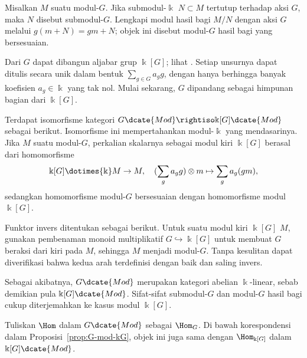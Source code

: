 \begin{definisi}
	Misalkan $M$ suatu modul-$G$. Jika submodul-$\Bbbk$ $N\subset M$ tertutup
	terhadap aksi $G$, maka $N$ disebut submodul-$G$. Lengkapi modul hasil bagi
	$M/N$ dengan aksi $G$ melalui $g(m+N)=gm+N$; objek ini disebut modul-$G$
	hasil bagi yang bersesuaian.
\end{definisi}

Dari $G$ dapat dibangun aljabar grup $\Bbbk[G]$; lihat
\cite[Definisi 5.6.3]{Li1}. Setiap unsurnya dapat ditulis secara unik dalam
bentuk $\sum_{g\in G}a_gg$, dengan hanya berhingga banyak koefisien
$a_g\in\Bbbk$ yang tak nol. Mulai sekarang, $G$ dipandang sebagai himpunan
bagian dari $\Bbbk[G]$.

\begin{proposisi}\label{prop:G-mod-kG}
	Terdapat isomorfisme kategori
	$G\dcate{Mod}\rightiso\Bbbk[G]\dcate{Mod}$ sebagai berikut. Isomorfisme ini
	mempertahankan modul-$\Bbbk$ yang mendasarinya. Jika $M$ suatu modul-$G$,
	perkalian skalarnya sebagai modul kiri $\Bbbk[G]$ berasal dari homomorfisme
	\[ \Bbbk[G] \dotimes{\Bbbk} M \to M, \quad (\sum_g a_g g) \otimes m \mapsto \sum_g a_g (gm), \]
	sedangkan homomorfisme modul-$G$ bersesuaian dengan homomorfisme modul
	$\Bbbk[G]$.
\end{proposisi}

\begin{bukti}
	Funktor invers ditentukan sebagai berikut. Untuk suatu modul kiri $\Bbbk[G]$
	$M$, gunakan pembenaman monoid multiplikatif $G\hookrightarrow\Bbbk[G]$
	untuk membuat $G$ beraksi dari kiri pada $M$, sehingga $M$ menjadi modul-$G$.
	Tanpa kesulitan dapat diverifikasi bahwa kedua arah terdefinisi dengan baik
	dan saling invers.
\end{bukti}

Sebagai akibatnya, $G\dcate{Mod}$ merupakan kategori abelian $\Bbbk$-linear,
sebab demikian pula $\Bbbk[G]\dcate{Mod}$. Sifat-sifat submodul-$G$ dan
modul-$G$ hasil bagi cukup diterjemahkan ke kasus modul $\Bbbk[G]$.

\begin{definisi}\label{def:HomG}
	Tuliskan $\Hom$ dalam $G\dcate{Mod}$ sebagai $\Hom_G$. Di bawah korespondensi
dalam Proposisi~\ref{prop:G-mod-kG}, objek ini juga sama dengan
	$\Hom_{\Bbbk[G]}$ dalam $\Bbbk[G]\dcate{Mod}$.
\end{definisi}

